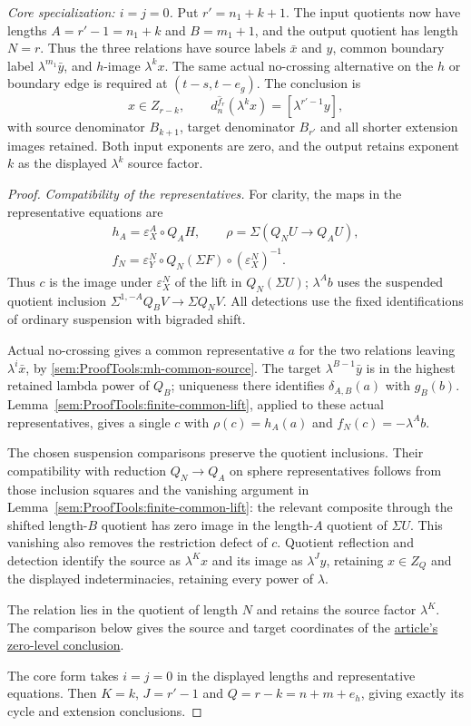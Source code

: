 \begin{theorem}
\textit{Core specialization: $i=j=0$.}
Put $r'=n_1+k+1$. The input quotients now have lengths
$A=r'-1=n_1+k$ and $B=m_1+1$, and the output quotient has length $N=r$.
Thus the three relations have source labels $\bar x$ and $y$, common
boundary label $\lambda^{m_1}\bar y$, and $h$-image $\lambda^kx$.
The same actual no-crossing alternative on the $h$ or boundary edge is
required at $(t-s,t-e_g)$. The conclusion is
\[
 x\in Z_{r-k},\qquad d_n^{\hat f_r}(\lambda^kx)
      =[\lambda^{r'-1}y],
\]
with source denominator $B_{k+1}$, target denominator $B_{r'}$ and all
shorter extension images retained. Both input exponents are zero, and the output retains exponent $k$
as the displayed $\lambda^k$ source factor.
\end{theorem}
\begin{proof}
\textit{Compatibility of the representatives.}
For clarity, the maps in the representative equations are
\[
\begin{gathered}
h_A=\varepsilon_X^A\circ Q_AH,\qquad
\rho=\Sigma(Q_NU\longrightarrow Q_AU),\\
f_N=\varepsilon_Y^N\circ Q_N(\Sigma F)\circ(\varepsilon_X^N)^{-1}.
\end{gathered}
\]
Thus $c$ is the image under $\varepsilon_X^N$ of the lift in
$Q_N(\Sigma U)$; $\lambda^A b$ uses the suspended quotient inclusion
$\Sigma^{1,-A}Q_BV\to\Sigma Q_NV$. All detections use the fixed
identifications of ordinary suspension with bigraded shift.

Actual no-crossing gives a common representative $a$ for the two
relations leaving $\lambda^i\bar x$, by
\ref{sem:ProofTools:mh-common-source}. The target
$\lambda^{B-1}\bar y$ is in the highest retained lambda power of $Q_B$;
uniqueness there identifies $\delta_{A,B}(a)$ with $g_B(b)$.
Lemma~\ref{sem:ProofTools:finite-common-lift}, applied to these actual
representatives, gives a single $c$ with
$\rho(c)=h_A(a)$ and $f_N(c)=-\lambda^Ab$.

The chosen suspension comparisons preserve the quotient
inclusions. Their compatibility with reduction $Q_N\to Q_A$ on sphere
representatives follows from those inclusion squares and the vanishing
argument in Lemma~\ref{sem:ProofTools:finite-common-lift}: the relevant
composite through the shifted length-$B$ quotient has zero image in the
length-$A$ quotient of $\Sigma U$. This vanishing also removes the
restriction defect of $c$.
Quotient reflection and detection identify the source as $\lambda^Kx$
and its image as $\lambda^Jy$, retaining $x\in Z_Q$ and the displayed
indeterminacies, retaining every power of $\lambda$.

The relation lies in the quotient of length $N$ and retains the
source factor $\lambda^K$. The comparison below gives the source and target coordinates of the
\href{paper/main.tex.html#L1860}{article's zero-level conclusion}.

The core form takes $i=j=0$ in the displayed lengths and representative
equations. Then $K=k$, $J=r'-1$ and $Q=r-k=n+m+e_h$, giving exactly
its cycle and extension conclusions.
\end{proof}

